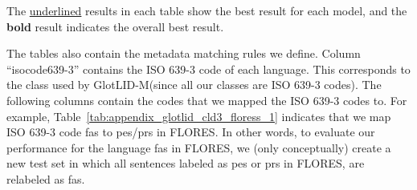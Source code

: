 \documentclass[11pt]{article}
\def\modelname{\mbox{GlotLID-M}\xspace}
\def\flores{FLORES\xspace}
\begin{document}
The \underline{underlined} results in each table show the best result for each model, and the \textbf{bold} result indicates the overall best result.

The tables also contain the metadata matching rules we
define. Column ``isocode639-3'' contains the ISO 639-3 code
of each language.
This corresponds to the class used by \modelname (since all
our classes are ISO 639-3 codes).
The following columns contain the codes that we mapped the
ISO 639-3 codes to. For example, Table~\ref{tab:appendix_glotlid_cld3_floress_1} indicates that we
map ISO 639-3 code fas to pes/prs in \flores. In other
words, to evaluate our performance for the language fas
in \flores, we (only conceptually) create a new test set in
which all sentences labeled as pes or prs in \flores, are
relabeled as fas.
\end{document}
